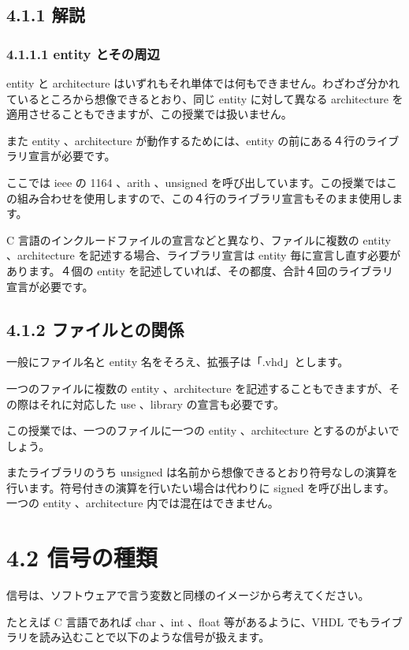 \documentclass[letterpaper,10pt,dvipdfmx]{sphinxmanual}
\begin{document}
\subsection{4.1.1 解説}
\label{04_vhdl:id2}

\subsubsection{4.1.1.1 entity とその周辺}
\label{04_vhdl:entity}
entity と architecture はいずれもそれ単体では何もできません。わざわざ分かれているところから想像できるとおり、同じ entity に対して異なる architecture を適用させることもできますが、この授業では扱いません。

また entity 、architecture が動作するためには、entity の前にある４行のライブラリ宣言が必要です。

ここでは ieee の 1164 、arith 、unsigned を呼び出しています。この授業ではこの組み合わせを使用しますので、この４行のライブラリ宣言もそのまま使用します。

C 言語のインクルードファイルの宣言などと異なり、ファイルに複数の entity 、architecture を記述する場合、ライブラリ宣言は entity 毎に宣言し直す必要があります。４個の entity を記述していれば、その都度、合計４回のライブラリ宣言が必要です。


\subsection{4.1.2 ファイルとの関係}
\label{04_vhdl:id3}
一般にファイル名と entity 名をそろえ、拡張子は「.vhd」とします。

一つのファイルに複数の entity 、architecture を記述することもできますが、その際はそれに対応した use 、library の宣言も必要です。

この授業では、一つのファイルに一つの entity 、architecture とするのがよいでしょう。

またライブラリのうち unsigned は名前から想像できるとおり符号なしの演算を行います。符号付きの演算を行いたい場合は代わりに signed を呼び出します。一つの entity 、architecture 内では混在はできません。


\section{4.2 信号の種類}
\label{04_vhdl:id4}
信号は、ソフトウェアで言う変数と同様のイメージから考えてください。

たとえば C 言語であれば char 、int 、float 等があるように、VHDL でもライブラリを読み込むことで以下のような信号が扱えます。
\end{document}
